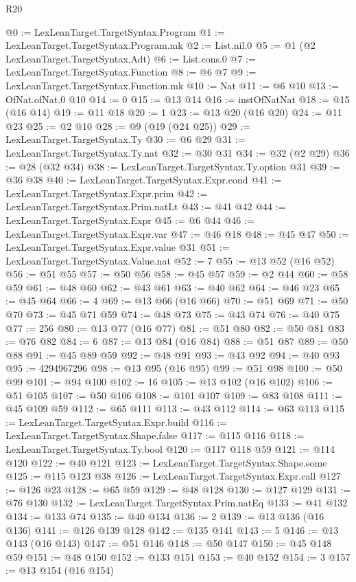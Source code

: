 \begin{lexlean}{R20}
\begin{coremodule}
@0 := LexLeanTarget.TargetSyntax.Program
@1 := LexLeanTarget.TargetSyntax.Program.mk
@2 := List.nil.{0}
@5 := @1 (@2 LexLeanTarget.TargetSyntax.Adt)
@6 := List.cons.{0}
@7 := LexLeanTarget.TargetSyntax.Function
@8 := @6 @7
@9 := LexLeanTarget.TargetSyntax.Function.mk
@10 := Nat
@11 := @6 @10
@13 := OfNat.ofNat.{0} @10
@14 := 0
@15 := @13 @14
@16 := instOfNatNat
@18 := @15 (@16 @14)
@19 := @11 @18
@20 := 1
@23 := @13 @20 (@16 @20)
@24 := @11 @23
@25 := @2 @10
@28 := @9 (@19 (@24 @25))
@29 := LexLeanTarget.TargetSyntax.Ty
@30 := @6 @29
@31 := LexLeanTarget.TargetSyntax.Ty.nat
@32 := @30 @31
@34 := @32 (@2 @29)
@36 := @28 (@32 @34)
@38 := LexLeanTarget.TargetSyntax.Ty.option @31
@39 := @36 @38
@40 := LexLeanTarget.TargetSyntax.Expr.cond
@41 := LexLeanTarget.TargetSyntax.Expr.prim
@42 := LexLeanTarget.TargetSyntax.Prim.natLt
@43 := @41 @42
@44 := LexLeanTarget.TargetSyntax.Expr
@45 := @6 @44
@46 := LexLeanTarget.TargetSyntax.Expr.var
@47 := @46 @18
@48 := @45 @47
@50 := LexLeanTarget.TargetSyntax.Expr.value @31
@51 := LexLeanTarget.TargetSyntax.Value.nat
@52 := 7
@55 := @13 @52 (@16 @52)
@56 := @51 @55
@57 := @50 @56
@58 := @45 @57
@59 := @2 @44
@60 := @58 @59
@61 := @48 @60
@62 := @43 @61
@63 := @40 @62
@64 := @46 @23
@65 := @45 @64
@66 := 4
@69 := @13 @66 (@16 @66)
@70 := @51 @69
@71 := @50 @70
@73 := @45 @71 @59
@74 := @48 @73
@75 := @43 @74
@76 := @40 @75
@77 := 256
@80 := @13 @77 (@16 @77)
@81 := @51 @80
@82 := @50 @81
@83 := @76 @82
@84 := 6
@87 := @13 @84 (@16 @84)
@88 := @51 @87
@89 := @50 @88
@91 := @45 @89 @59
@92 := @48 @91
@93 := @43 @92
@94 := @40 @93
@95 := 4294967296
@98 := @13 @95 (@16 @95)
@99 := @51 @98
@100 := @50 @99
@101 := @94 @100
@102 := 16
@105 := @13 @102 (@16 @102)
@106 := @51 @105
@107 := @50 @106
@108 := @101 @107
@109 := @83 @108
@111 := @45 @109 @59
@112 := @65 @111
@113 := @43 @112
@114 := @63 @113
@115 := LexLeanTarget.TargetSyntax.Expr.build
@116 := LexLeanTarget.TargetSyntax.Shape.false
@117 := @115 @116
@118 := LexLeanTarget.TargetSyntax.Ty.bool
@120 := @117 @118 @59
@121 := @114 @120
@122 := @40 @121
@123 := LexLeanTarget.TargetSyntax.Shape.some
@125 := @115 @123 @38
@126 := LexLeanTarget.TargetSyntax.Expr.call
@127 := @126 @23
@128 := @65 @59
@129 := @48 @128
@130 := @127 @129
@131 := @76 @130
@132 := LexLeanTarget.TargetSyntax.Prim.natEq
@133 := @41 @132
@134 := @133 @74
@135 := @40 @134
@136 := 2
@139 := @13 @136 (@16 @136)
@141 := @126 @139 @128
@142 := @135 @141
@143 := 5
@146 := @13 @143 (@16 @143)
@147 := @51 @146
@148 := @50 @147
@150 := @45 @148 @59
@151 := @48 @150
@152 := @133 @151
@153 := @40 @152
@154 := 3
@157 := @13 @154 (@16 @154)

\end{coremodule}
\end{lexlean}
